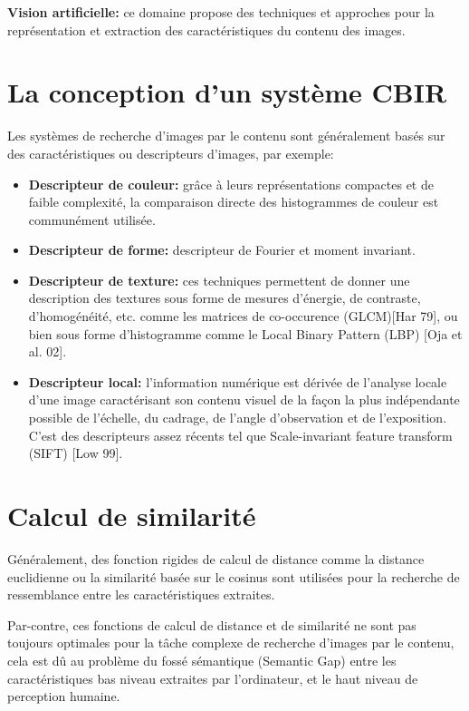 \textbf{Vision artificielle:} ce domaine propose des techniques et approches pour la représentation et extraction des caractéristiques du contenu des images.


\section{La conception d'un système CBIR}

	Les systèmes de recherche d'images par le contenu sont généralement basés sur des caractéristiques ou descripteurs d'images, par exemple:
	
\begin{itemize}

\item \textbf{Descripteur  de couleur:} grâce à leurs représentations compactes et de faible complexité, la comparaison directe des histogrammes de couleur est communément utilisée.
\item \textbf{Descripteur de forme:} descripteur de Fourier et moment invariant.
\item \textbf{Descripteur de texture:} ces techniques permettent de donner une description des textures sous forme de mesures d'énergie, de contraste, d'homogénéité, etc. comme les matrices de co-occurence (GLCM)[Har 79], ou bien sous forme d'histogramme comme le Local Binary Pattern (LBP) [Oja et al. 02].
\item \textbf{Descripteur local:}  l'information numérique est dérivée de l'analyse locale d'une image caractérisant son contenu visuel de la façon la plus indépendante possible de l'échelle, du cadrage, de l'angle d'observation et de l'exposition. C'est des descripteurs assez récents tel que Scale-invariant feature transform (SIFT) [Low 99].

\end{itemize}

\section{Calcul de similarité}

	Généralement, des fonction rigides de calcul de distance comme la distance euclidienne ou la similarité basée sur le cosinus sont utilisées pour la recherche de ressemblance entre les caractéristiques extraites.

	Par-contre, ces fonctions de calcul de distance et de similarité ne sont pas toujours optimales pour la tâche complexe de recherche d'images par le contenu, cela est dû au problème du fossé sémantique (Semantic Gap) entre les caractéristiques bas niveau extraites par l'ordinateur, et le haut niveau de perception humaine.


